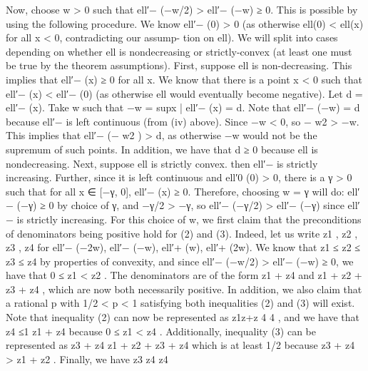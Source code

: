 \documentclass[10pt]{article}
\begin{document}
\begin{ReviewVerbatim}
Now, choose w > 0 such that ell′− (−w/2) > ell′− (−w) ≥ 0. This is possible by using the following
procedure. We know ell′− (0) > 0 (as otherwise ell(0) < ell(x) for all x < 0, contradicting our assump-
tion on ell). We will split into cases depending on whether ell is nondecreasing or strictly-convex (at
least one must be true by the theorem assumptions).
First, suppose ell is non-decreasing. This implies that ell′− (x) ≥ 0 for all x. We know that there is
a point x < 0 such that ell′− (x) < ell′− (0) (as otherwise ell would eventually become negative). Let
d = ell′− (x). Take w such that
                                   −w = sup{x | ell′− (x) = d}.
Note that ell′− (−w) = d because ell′− is left continuous (from (iv) above). Since −w < 0, so − w2 >
−w. This implies that ell′− (− w2 ) > d, as otherwise −w would not be the supremum of such points.
In addition, we have that d ≥ 0 because ell is nondecreasing.
Next, suppose ell is strictly convex. then ell′− is strictly increasing. Further, since it is left continuous
and ell′0 (0) > 0, there is a γ > 0 such that for all x ∈ [−γ, 0], ell′− (x) ≥ 0. Therefore, choosing w = γ
will do: ell′− (−γ) ≥ 0 by choice of γ, and −γ/2 > −γ, so ell′− (−γ/2) > ell′− (−γ) since ell′− is strictly
increasing.
For this choice of w, we first claim that the preconditions of denominators being positive hold for
(2) and (3). Indeed, let us write z1 , z2 , z3 , z4 for ell′− (−2w), ell′− (−w), ell′+ (w), ell′+ (2w). We know that
                                           z1 ≤ z2 ≤ z3 ≤ z4
by properties of convexity, and since ell′− (−w/2) > ell′− (−w) ≥ 0, we have that 0 ≤ z1 < z2 . The
denominators are of the form z1 + z4 and z1 + z2 + z3 + z4 , which are now both necessarily positive.
In addition, we also claim that a rational p with 1/2 < p < 1 satisfying both inequalities (2) and (3)
will exist. Note that inequality (2) can now be represented as z1z+z
                                                                  4
                                                                     4
                                                                       , and we have that
                                                  z4
                                                       ≤1
                                               z1 + z4
because 0 ≤ z1 < z4 . Additionally, inequality (3) can be represented as
                                                 z3 + z4
                                            z1 + z2 + z3 + z4
which is at least 1/2 because z3 + z4 > z1 + z2 . Finally, we have
                                        z3        z4        z4

\end{ReviewVerbatim}
\end{document}
